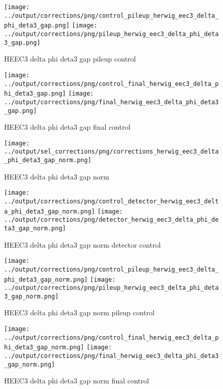 \documentclass[11pt]{book}
\begin{document}
\begin{figure}[ht]
\centering
\texttt{[image: ../output/corrections/png/control\_pileup\_herwig\_eec3\_delta\_phi\_deta3\_gap.png]}
\texttt{[image: ../output/corrections/png/pileup\_herwig\_eec3\_delta\_phi\_deta3\_gap.png]}
\caption{HEEC3 delta phi deta3 gap pileup control}
\label{fig:HEEC3_delta_phi_deta3_gap_pileup_control}
\end{figure}


\begin{figure}[ht]
\centering
\texttt{[image: ../output/corrections/png/control\_final\_herwig\_eec3\_delta\_phi\_deta3\_gap.png]}
\texttt{[image: ../output/corrections/png/final\_herwig\_eec3\_delta\_phi\_deta3\_gap.png]}
\caption{HEEC3 delta phi deta3 gap final control}
\label{fig:HEEC3_delta_phi_deta3_gap_final_control}
\end{figure}


\begin{figure}[ht]
\centering
\texttt{[image: ../output/sel\_corrections/png/corrections\_herwig\_eec3\_delta\_phi\_deta3\_gap\_norm.png]}
\caption{HEEC3 delta phi deta3 gap norm}
\label{fig:HEEC3_delta_phi_deta3_gap_norm}
\end{figure}

\begin{figure}[ht]
\centering
\texttt{[image: ../output/corrections/png/control\_detector\_herwig\_eec3\_delta\_phi\_deta3\_gap\_norm.png]}
\texttt{[image: ../output/corrections/png/detector\_herwig\_eec3\_delta\_phi\_deta3\_gap\_norm.png]}
\caption{HEEC3 delta phi deta3 gap norm detector control}
\label{fig:HEEC3_delta_phi_deta3_gap_norm_detector_control}
\end{figure}

\begin{figure}[ht]
\centering
\texttt{[image: ../output/corrections/png/control\_pileup\_herwig\_eec3\_delta\_phi\_deta3\_gap\_norm.png]}
\texttt{[image: ../output/corrections/png/pileup\_herwig\_eec3\_delta\_phi\_deta3\_gap\_norm.png]}
\caption{HEEC3 delta phi deta3 gap norm pileup control}
\label{fig:HEEC3_delta_phi_deta3_gap_norm_pileup_control}
\end{figure}


\begin{figure}[ht]
\centering
\texttt{[image: ../output/corrections/png/control\_final\_herwig\_eec3\_delta\_phi\_deta3\_gap\_norm.png]}
\texttt{[image: ../output/corrections/png/final\_herwig\_eec3\_delta\_phi\_deta3\_gap\_norm.png]}
\caption{HEEC3 delta phi deta3 gap norm final control}
\label{fig:HEEC3_delta_phi_deta3_gap_norm_final_control}
\end{figure}
\end{document}
